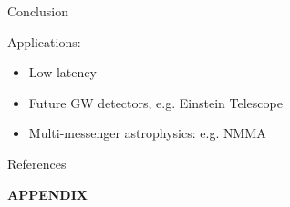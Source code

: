 \documentclass[usenames,dvipsnames,t]{beamer}
\begin{document}
\begin{frame}{Conclusion}
\begin{itemize}
  \end{itemize}

  \vspace{\x}

  Applications:
  \begin{itemize}
    \item Low-latency
    
    \vspace{\x}

    \item Future GW detectors, e.g. Einstein Telescope

    \vspace{\x}

    \item Multi-messenger astrophysics: e.g. \textsc{NMMA}~\cite{Pang:2022rzc}
  \end{itemize}

  
\end{frame}

\begin{frame}{References}

\nocite{*}

\printbibliography
    
\end{frame}


\appendix

\begin{frame}
\vfill
\centering
\textbf{APPENDIX}
\vfill
\end{frame}
\end{document}
